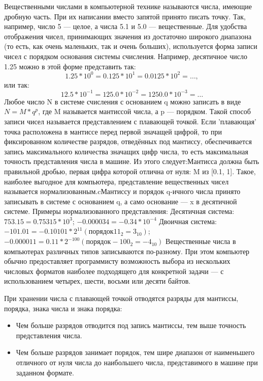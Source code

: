 \documentclass[a4paper]{article}
\begin{document}
Вещественными числами в компьютерной технике называются числа, имеющие дробную часть. При их написании вместо запятой принято писать точку. Так, например, число 5 — целое, а числа 5.1 и 5.0 — вещественные. Для удобства отображения чисел, принимающих значения из достаточно широкого диапазона (то есть, как очень маленьких, так и очень больших), используется форма записи чисел с порядком основания системы счисления. Например, десятичное число 1.25 можно в этой форме представить так:
\[1.25*10^{0} = 0.125*10^{1} = 0.0125*10^{2} = \ldots ,\]
или так:
\[12.5*10^{-1} = 125.0*10^{-2} = 1250.0*10^{-3} = \ldots \]
Любое число N в системе счисления с основанием q можно записать в виде $N = M * q^{p}$, где M называется мантиссой числа, а p — порядком. Такой способ записи чисел называется представлением с плавающей точкой.
Если 'плавающая' точка расположена в мантиссе перед первой значащей цифрой, то при фиксированном количестве разрядов, отведённых под мантиссу, обеспечивается запись максимального количества значащих цифр числа, то есть максимальная точность представления числа в машине. Из этого следует:\newline Мантисса должна быть правильной дробью, первая цифра которой отлична от нуля: M из [0.1, 1]. Такое, наиболее выгодное для компьютера, представление вещественных чисел называется нормализованным.cМантиссу и порядок q-ичного числа принято записывать в системе с основанием q, а само основание --- x в десятичной системе.
Примеры нормализованного представления: \newline
Десятичная система: \newline
$753.15 = 0.75315*10^{3}$;
$-0.000034 = -0.34*10^{-4}$ \newline
Двоичная система: \newline
$-101.01 = -0.10101*2^{11} (порядок 11_{2} = 3_{10})$;
$-0.000011 = 0.11*2^{-100} (порядок -100_{2} = -4_{10})$ \newline
Вещественные числа в компьютерах различных типов записываются по-разному. При этом компьютер обычно предоставляет программисту возможность выбора из нескольких числовых форматов наиболее подходящего для конкретной задачи — с использованием четырех, шести, восьми или десяти байтов.

При хранении числа с плавающей точкой отводятся разряды для мантиссы, порядка, знака числа и знака порядка:
\begin{itemize}
\item Чем больше разрядов отводится под запись мантиссы, тем выше точность представления числа.
\item Чем больше разрядов занимает порядок, тем шире диапазон от наименьшего отличного от нуля числа до наибольшего числа, представимого в машине при заданном формате.
\end{itemize}
\end{document}
